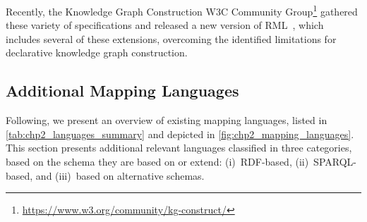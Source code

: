Recently, the Knowledge Graph Construction W3C Community Group\footnote{\url{https://www.w3.org/community/kg-construct/}} gathered these variety of specifications and released a new version of RML~\parencite{iglesias2023rml}, which includes several of these extensions, overcoming the identified limitations for declarative knowledge graph construction.




\subsection{Additional Mapping Languages}
\label{sec:chp2_more-languages}

Following, we present an overview of existing mapping languages, listed in \cref{tab:chp2_languages_summary} and depicted in  \cref{fig:chp2_mapping_languages}. This section presents additional relevant languages classified in three categories, based on the schema they are based on or extend: (i)~RDF-based, (ii)~SPARQL-based, and (iii)~based on alternative schemas.


